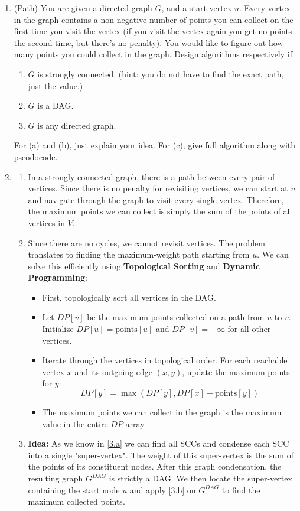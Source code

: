 \documentclass[12pt,a4paper]{article}
\makeatletter
\newtheorem*{solution}{Solution}
\theoremstyle{definition}
\renewenvironment{solution}[1][Solution] {\par\pushQED{\qed}\normalfont\topsep6\p@\@plus6\p@\relax\trivlist\item[\hskip\labelsep\bfseries#1\@addpunct{.}]\ignorespaces}{\popQED\endtrivlist\@endpefalse} \makeatother
\makeatother
\begin{document}
\begin{enumerate}
    \item {\color{purple}(Path)} You are given a directed graph $G$, and a start vertex $u$. Every vertex in the graph contains a non-negative number of points you can collect on the first time you visit the vertex (if you visit the vertex again you get no points the second time, but there’s no penalty). You would like to figure out how many points you could collect in the graph. Design algorithms respectively if 
    \begin{enumerate}
        \item $G$ is strongly connected. (hint: you do not have to find the exact path, just the value.)
        \item $G$ is a DAG. 
        \item $G$ is any directed graph.
    \end{enumerate}
    For (a) and (b), just explain your idea. For (c), give full algorithm along with pseodocode.

    \begin{solution}
        \begin{enumerate}
            \item \label{3.a} In a strongly connected graph, there is a path between every pair of vertices. Since there is no penalty for revisiting vertices, we can start at $u$ and navigate through the graph to visit every single vertex. Therefore, the maximum points we can collect is simply the sum of the points of all vertices in $V$.
            
            \item \label{3.b} Since there are no cycles, we cannot revisit vertices. The problem translates to finding the maximum-weight path starting from $u$. We can solve this efficiently using \textbf{Topological Sorting} and \textbf{Dynamic Programming}:
    \begin{itemize}
        \item First, topologically sort all vertices in the DAG.
        \item Let $DP[v]$ be the maximum points collected on a path from $u$ to $v$. Initialize $DP[u] = \text{points}[u]$ and $DP[v] = -\infty$ for all other vertices.
        \item Iterate through the vertices in topological order. For each reachable vertex $x$ and its outgoing edge $(x, y)$, update the maximum points for $y$: 
        $$DP[y] = \max(DP[y], DP[x] + \text{points}[y])$$
        \item The maximum points we can collect in the graph is the maximum value in the entire $DP$ array.
    \end{itemize}
            \item 
    \textbf{Idea:} 
    As we know in \ref{3.a}  we can  find all SCCs and condense each SCC into a single "super-vertex". The weight of this super-vertex is the sum of the points of its constituent nodes. After this graph condensation, the resulting graph $G^{DAG}$ is strictly a DAG. We then locate the super-vertex containing the start node $u$ and apply \ref{3.b} on $G^{DAG}$ to find the maximum collected points.


\end{enumerate}
\end{solution}
\end{enumerate}
\end{document}
